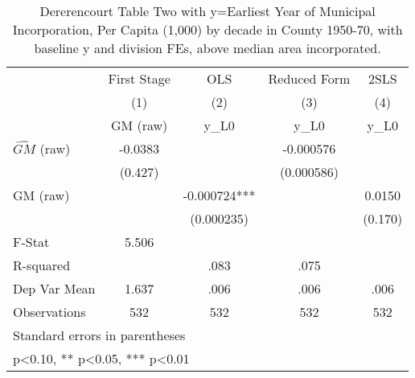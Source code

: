 \begin{table}[htbp]\centering
\def\sym#1{\ifmmode^{#1}\else\(^{#1}\)\fi}
\caption{Dererencourt Table Two with y=Earliest Year of Municipal Incorporation, Per Capita (1,000) by decade in County 1950-70, with baseline y and division FEs, above median area incorporated.}
\begin{tabular}{l*{4}{c}}
\toprule
                    & First Stage   &         OLS   &Reduced Form   &        2SLS   \\
                    &\multicolumn{1}{c}{(1)}&\multicolumn{1}{c}{(2)}&\multicolumn{1}{c}{(3)}&\multicolumn{1}{c}{(4)}\\
                    &\multicolumn{1}{c}{GM  (raw)}&\multicolumn{1}{c}{y\_L0}&\multicolumn{1}{c}{y\_L0}&\multicolumn{1}{c}{y\_L0}\\
\midrule
$\hat{GM}$ (raw)    &     -0.0383   &               &   -0.000576   &               \\
                    &     (0.427)   &               &  (0.000586)   &               \\
\addlinespace
GM  (raw)           &               &   -0.000724***&               &      0.0150   \\
                    &               &  (0.000235)   &               &     (0.170)   \\
\midrule
F-Stat              &       5.506   &               &               &               \\
R-squared           &               &        .083   &        .075   &               \\
Dep Var Mean        &       1.637   &        .006   &        .006   &        .006   \\
Observations        &         532   &         532   &         532   &         532   \\
\bottomrule
\multicolumn{5}{l}{\footnotesize Standard errors in parentheses}\\
\multicolumn{5}{l}{\footnotesize * p<0.10, ** p<0.05, *** p<0.01}\\
\end{tabular}
\end{table}
